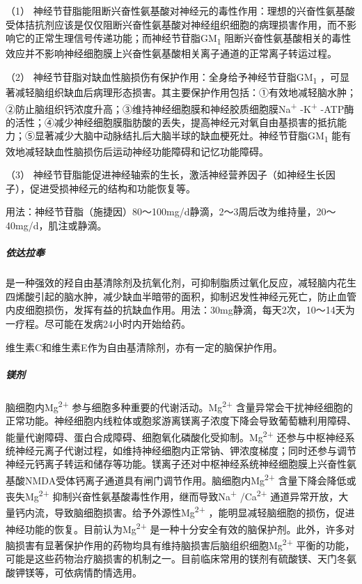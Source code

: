 （1）
神经节苷脂能阻断兴奋性氨基酸对神经元的毒性作用：理想的兴奋性氨基酸受体拮抗剂应该是仅仅阻断兴奋性氨基酸对神经组织细胞的病理损害作用，而不影响它的正常生理信号传递功能；而神经节苷脂GM\textsubscript{1}
阻断兴奋性氨基酸相关的毒性效应并不影响神经细胞膜上兴奋性氨基酸相关离子通道的正常离子转运过程。

（2）
神经节苷脂对缺血性脑损伤有保护作用：全身给予神经节苷脂GM\textsubscript{1}
，可显著减轻脑组织缺血后病理形态损害。其主要保护作用包括：①有效地减轻脑水肿；②防止脑组织钙浓度升高；③维持神经细胞膜和神经胶质细胞膜Na\textsuperscript{+}
-K\textsuperscript{+}
-ATP酶的活性；④减少神经细胞膜脂肪酸的丢失，提高神经元对氧自由基损害的抵抗能力；⑤显著减少大脑中动脉结扎后大脑半球的缺血梗死灶。神经节苷脂GM\textsubscript{1}
能有效地减轻缺血性脑损伤后运动神经功能障碍和记忆功能障碍。

（3）
神经节苷脂能促进神经轴索的生长，激活神经营养因子（如神经生长因子），促进受损神经元的结构和功能恢复等。

用法：神经节苷脂（施捷因）80～100mg/d静滴，2～3周后改为维持量，20～40mg/d，肌注或静滴。

\subparagraph{依达拉奉}

是一种强效的羟自由基清除剂及抗氧化剂，可抑制脂质过氧化反应，减轻脑内花生四烯酸引起的脑水肿，减少缺血半暗带的面积，抑制迟发性神经元死亡，防止血管内皮细胞损伤，发挥有益的抗缺血作用。用法：30mg静滴，每天2次，10～14天为一疗程。尽可能在发病24小时内开始给药。

维生素C和维生素E作为自由基清除剂，亦有一定的脑保护作用。

\subparagraph{镁剂}

脑细胞内Mg\textsuperscript{2+}
参与细胞多种重要的代谢活动。Mg\textsuperscript{2+}
含量异常会干扰神经细胞的正常功能。神经细胞内线粒体或胞浆游离镁离子浓度下降会导致葡萄糖利用障碍、能量代谢障碍、蛋白合成障碍、细胞氧化磷酸化受抑制。Mg\textsuperscript{2+}
还参与中枢神经系统神经元离子代谢过程，如维持神经细胞内正常钠、钾浓度梯度；同时还参与调节神经元钙离子转运和储存等功能。镁离子还对中枢神经系统神经细胞膜上兴奋性氨基酸NMDA受体钙离子通道具有闸门调节作用。脑细胞内Mg\textsuperscript{2+}
含量下降会降低或丧失Mg\textsuperscript{2+}
抑制兴奋性氨基酸毒性作用，继而导致Na\textsuperscript{+}
/Ca\textsuperscript{2+}
通道异常开放，大量钙内流，导致脑细胞损害。给予外源性Mg\textsuperscript{2+}
，能明显减轻脑细胞的损伤，促进神经功能的恢复。目前认为Mg\textsuperscript{2+}
是一种十分安全有效的脑保护剂。此外，许多对脑损害有显著保护作用的药物均具有维持脑损害后脑组织细胞Mg\textsuperscript{2+}
平衡的功能，可能是这些药物治疗脑损害的机制之一。目前临床常用的镁剂有硫酸镁、天门冬氨酸钾镁等，可依病情酌情选用。


